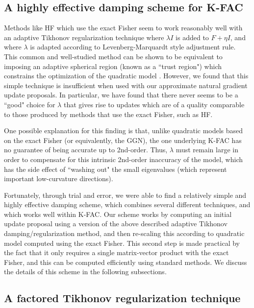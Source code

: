 \documentclass[12pt]{article}
\newcommand{\acronym}{K-FAC}
\begin{document}
\subsection{A highly effective damping scheme for \acronym{}}

Methods like HF which use the exact Fisher seem to work reasonably well with an adaptive Tikhonov regularization technique where $\lambda I$ is added to $F + \eta I$, and where $\lambda$ is adapted according to Levenberg-Marquardt style adjustment rule. %
This common and well-studied method can be shown to be equivalent to imposing an adaptive spherical region (known as a ``trust region") which constrains the optimization of the quadratic model \citep[e.g][]{nocedal_book}.  However, we found that this simple technique is insufficient when used with our approximate natural gradient update proposals.  In particular, we have found that there never seems to be a ``good" choice for $\lambda$ that gives rise to updates which are of a quality comparable to those produced by methods that use the exact Fisher, such as HF.  

One possible explanation for this finding is that, unlike quadratic models based on the exact Fisher (or equivalently, the GGN), the one underlying \acronym{} has no guarantee of being accurate up to 2nd-order.  Thus, $\lambda$ must remain large in order to compensate for this intrinsic 2nd-order inaccuracy of the model, which has the side effect of ``washing out" the small eigenvalues (which represent important low-curvature directions).

Fortunately, through trial and error, we were able to find a relatively simple and highly effective damping scheme, which combines several different techniques, and which works well within \acronym{}.  Our scheme works by computing an initial update proposal using a version of the above described adaptive Tikhonov damping/regularization method, and then re-scaling this according to quadratic model computed using the exact Fisher.  This second step is made practical by the fact that it only requires a single matrix-vector product with the exact Fisher, and this can be computed efficiently using standard methods.  We discuss the details of this scheme in the following subsections.


\subsection{A factored Tikhonov regularization technique}
\label{sec:factored_tik}
\end{document}
